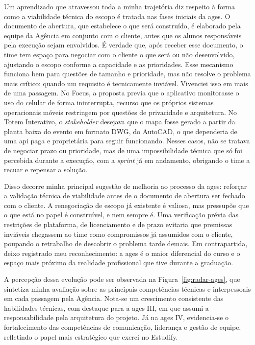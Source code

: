 Um aprendizado que atravessou toda a minha trajetória diz respeito à forma como a viabilidade técnica do escopo é tratada nas fases iniciais da \ac{ages}. O documento de abertura, que estabelece o que será construído, é elaborado pela equipe da Agência em conjunto com o cliente, antes que os alunos responsáveis pela execução sejam envolvidos. É verdade que, após receber esse documento, o time tem espaço para negociar com o cliente o que será ou não desenvolvido, ajustando o escopo conforme a capacidade e as prioridades. Esse mecanismo funciona bem para questões de tamanho e prioridade, mas não resolve o problema mais crítico: quando um requisito é tecnicamente inviável. Vivenciei isso em mais de uma passagem. No Focus, a proposta previa que o aplicativo monitorasse o uso do celular de forma ininterrupta, recurso que os próprios sistemas operacionais móveis restringem por questões de privacidade e arquitetura. No Totem Interativo, o \textit{stakeholder} desejava que o mapa fosse gerado a partir da planta baixa do evento em formato DWG, do AutoCAD, o que dependeria de uma \ac{api} paga e proprietária para seguir funcionando. Nesses casos, não se tratava de negociar prazo ou prioridade, mas de uma impossibilidade técnica que só foi percebida durante a execução, com a \textit{sprint} já em andamento, obrigando o time a recuar e repensar a solução.

Disso decorre minha principal sugestão de melhoria ao processo da \ac{ages}: reforçar a validação técnica de viabilidade antes de o documento de abertura ser fechado com o cliente. A renegociação de escopo já existente é valiosa, mas pressupõe que o que está no papel é construível, e nem sempre é. Uma verificação prévia das restrições de plataforma, de licenciamento e de prazo evitaria que premissas inviáveis chegassem ao time como compromissos já assumidos com o cliente, poupando o retrabalho de descobrir o problema tarde demais. Em contrapartida, deixo registrado meu reconhecimento: a \ac{ages} é o maior diferencial do curso e o espaço mais próximo da realidade profissional que tive durante a graduação.

A percepção dessa evolução pode ser observada na Figura~\ref{fig:radar-ages}, que sintetiza minha avaliação sobre as principais competências técnicas e interpessoais em cada passagem pela Agência. Nota-se um crescimento consistente das habilidades técnicas, com destaque para a \ac{ages} III, em que assumi a responsabilidade pela arquitetura do projeto. Já na \ac{ages} IV, evidencia-se o fortalecimento das competências de comunicação, liderança e gestão de equipe, refletindo o papel mais estratégico que exerci no Estudify.

